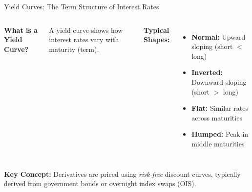 \documentclass[aspectratio=169,11pt]{beamer}
\begin{document}
\begin{frame}{Yield Curves: The Term Structure of Interest Rates}
\begin{columns}
\textbf{What is a Yield Curve?}

A yield curve shows how interest rates vary with maturity (term).

\vspace{0.3cm}
\textbf{Typical Shapes:}
\begin{itemize}
    \item \textbf{Normal:} Upward sloping (short $<$ long)
    \item \textbf{Inverted:} Downward sloping (short $>$ long)
    \item \textbf{Flat:} Similar rates across maturities
    \item \textbf{Humped:} Peak in middle maturities
\end{itemize}

\end{columns}

\vspace{0.3cm}
\textbf{Key Concept:} Derivatives are priced using \emph{risk-free} discount curves, typically derived from government bonds or overnight index swaps (OIS).
\end{frame}
\end{document}
